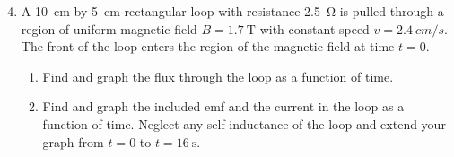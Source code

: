 \documentclass[11pt]{article}
\begin{document}
\begin{enumerate}[leftmargin=18pt]

  \setcounter{enumi}{3}
\item A \SI{10}{cm} by \SI{5}{cm} rectangular loop with resistance
  \SI{2.5}{\ohm} is pulled through a region of uniform magnetic field
  $B=\SI{1.7}{\tesla}$ with constant speed $v=\SI{2.4}{cm/s}$. The front of the
  loop enters the region of the magnetic field at time $t=0$.
  \begin{enumerate}[noitemsep,leftmargin=18pt]
  \item Find and graph the flux through the loop as a function of time.
  \item Find and graph the included emf and the current in the loop as a
    function of time. Neglect any self inductance of the loop and extend your
    graph from $t=0$ to $t=\SI{16}{\second}$.
  \end{enumerate}
\end{enumerate}
\end{document}
